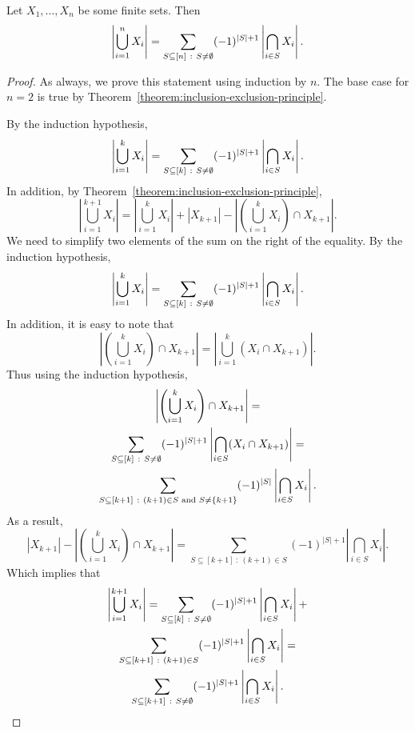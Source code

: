 \begin{corollary}
\label{corollary:inclusion-exclusion-principle}
  Let $X_1, \dots, X_n$ be some finite sets. Then
  \[
    \left|\bigcup_{i = 1}^n X_i\right| =
    \sum_{S \subseteq {[{n}]} ~:~ S \neq \emptyset} (-1)^{|S| + 1}
      \left|\bigcap_{i \in S} X_i\right|.
  \]
\end{corollary}
\begin{proof}
  As always, we prove this statement using induction by $n$. The base case for
  $n = 2$ is true by Theorem~\ref{theorem:inclusion-exclusion-principle}.

  By the induction hypothesis,
  \[
    \left|\bigcup_{i = 1}^k X_i\right| =
    \sum_{S \subseteq {[{k}]} ~:~ S \neq \emptyset} (-1)^{|S| + 1}
      \left|\bigcap_{i \in S} X_i\right|.
  \]
  In addition, by Theorem~\ref{theorem:inclusion-exclusion-principle},
  \[
    \left|\bigcup_{i = 1}^{k + 1} X_i\right| =
    \left|\bigcup_{i = 1}^k X_i\right| + |X_{k + 1}| -
      \left|\left(\bigcup_{i = 1}^k X_i\right) \cap X_{k + 1}\right|.
  \]
  We need to simplify two elements of the sum on the right of the equality.
  By the induction hypothesis,
  \[
    \left|\bigcup_{i = 1}^k X_i\right| =
      \sum_{S \subseteq {[{k}]} ~:~ S \neq \emptyset}
        (-1)^{|S| + 1}
        \left|
          \bigcap_{i \in S} X_i
        \right|.
  \]
  In addition, it is easy to note that
  \[
    \left|\left(\bigcup_{i = 1}^k X_i\right) \cap X_{k + 1}\right| =
    \left|\bigcup_{i = 1}^k \left(X_i \cap X_{k + 1}\right)\right|.
  \]
  Thus using the induction hypothesis,
  \begin{multline*}
    \left|\left(\bigcup_{i = 1}^k X_i\right) \cap X_{k + 1}\right| = \\
    \sum_{S \subseteq \range{k} ~:~ S \neq \emptyset}
          (-1)^{|S| + 1}
          \left|
            \bigcap_{i \in S} (X_i \cap X_{k + 1})
          \right| = \\
    \sum_{S \subseteq [k + 1] ~:~ (k + 1) \in S \text{ and } S \neq \set{k + 1}}
          (-1)^{|S|} \left|\bigcap_{i \in S} X_i \right|.
  \end{multline*}
  As a result,
  \[
    |X_{k + 1}| -
      \left|\left(\bigcup_{i = 1}^k X_i\right) \cap X_{k + 1}\right| =
    \sum_{S \subseteq [k + 1] ~:~ (k + 1) \in S}
          (-1)^{|S| + 1} \left|\bigcap_{i \in S} X_i \right|.
  \]
  Which implies that
  \begin{multline*}
    \left|\bigcup_{i = 1}^{k + 1} X_i\right| =
    \sum_{S \subseteq {[{k}]} ~:~ S \neq \emptyset}
      (-1)^{|S| + 1}
      \left|
        \bigcap_{i \in S} X_i
      \right| + \\
    \sum_{S \subseteq [k + 1] ~:~ (k + 1) \in S}
          (-1)^{|S| + 1} \left|\bigcap_{i \in S} X_i \right| = \\
    \sum_{S \subseteq [k + 1] ~:~ S \neq \emptyset}
      (-1)^{|S| + 1}
      \left|
        \bigcap_{i \in S} X_i
      \right|.
  \end{multline*}
\end{proof}




